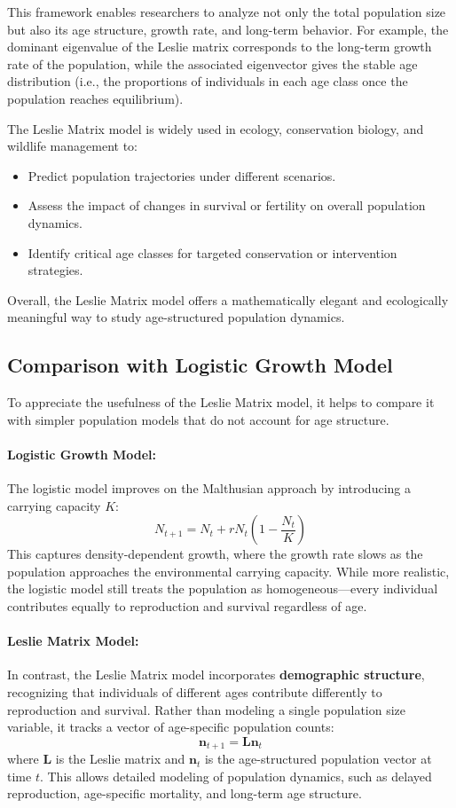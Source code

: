 \documentclass{article}
\begin{document}
This framework enables researchers to analyze not only the total population size but also its age structure, growth rate, and long-term behavior. For example, the dominant eigenvalue of the Leslie matrix corresponds to the long-term growth rate of the population, while the associated eigenvector gives the stable age distribution (i.e., the proportions of individuals in each age class once the population reaches equilibrium).

The Leslie Matrix model is widely used in ecology, conservation biology, and wildlife management to:
\begin{itemize}
    \item Predict population trajectories under different scenarios.
    \item Assess the impact of changes in survival or fertility on overall population dynamics.
    \item Identify critical age classes for targeted conservation or intervention strategies.
\end{itemize}

Overall, the Leslie Matrix model offers a mathematically elegant and ecologically meaningful way to study age-structured population dynamics.


\subsection*{Comparison with Logistic Growth Model}

To appreciate the usefulness of the Leslie Matrix model, it helps to compare it with simpler population models that do not account for age structure.



\paragraph{Logistic Growth Model:}
The logistic model improves on the Malthusian approach by introducing a carrying capacity $K$:
\[
N_{t+1} = N_t + rN_t\left(1 - \frac{N_t}{K}\right)
\]
This captures density-dependent growth, where the growth rate slows as the population approaches the environmental carrying capacity. While more realistic, the logistic model still treats the population as homogeneous—every individual contributes equally to reproduction and survival regardless of age.

\paragraph{Leslie Matrix Model:}
In contrast, the Leslie Matrix model incorporates \textbf{demographic structure}, recognizing that individuals of different ages contribute differently to reproduction and survival. Rather than modeling a single population size variable, it tracks a vector of age-specific population counts:
\[
\mathbf{n}_{t+1} = \mathbf{L} \mathbf{n}_t
\]
where $\mathbf{L}$ is the Leslie matrix and $\mathbf{n}_t$ is the age-structured population vector at time $t$. This allows detailed modeling of population dynamics, such as delayed reproduction, age-specific mortality, and long-term age structure.
\end{document}
